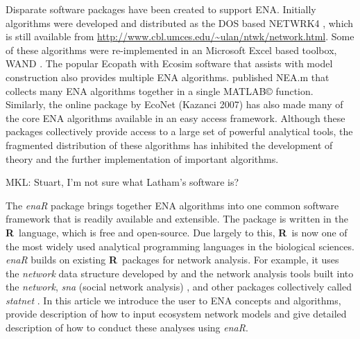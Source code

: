 \documentclass[article]{jss}
\newcommand{\R}{\textbf{R}}
\begin{document}
Disparate software packages have been created to support
ENA. Initially algorithms were developed and distributed as the DOS
based NETWRK4 \cite{ulanowicz91}, which is still available from
\url{http://www.cbl.umces.edu/~ulan/ntwk/network.html}.  Some of these
algorithms were re-implemented in an Microsoft Excel based toolbox,
WAND \cite{allesina04_wand}. The popular Ecopath with Ecosim software
that assists with model construction \citep{christensen04} also
provides multiple ENA algorithms. \citet{fath06} published NEA.m that
collects many ENA algorithms together in a single MATLAB\copyright
function. Similarly, the online package by EcoNet (Kazanci 2007) has
also made many of the core ENA algorithms available in an easy access
framework.  Although these packages collectively provide access to a
large set of powerful analytical tools, the fragmented distribution of
these algorithms has inhibited the development of theory and the
further implementation of important algorithms.

{\color{red} MKL: Stuart, I'm not sure what Latham's software is?}


The \textit{enaR} package brings together ENA algorithms into one
common software framework that is readily available and extensible.
The package is written in the \R\ language, which is free and
open-source.  Due largely to this, \R\ is now one of the most widely
used analytical programming languages in the biological
sciences. \textit{enaR} builds on existing \R\ packages for
network analysis. For example, it uses the \textit{network} data
structure developed by \citet{butts08_network} and the network
analysis tools built into the \textit{network}, \textit{sna} (social
network analysis) \citep{butts08_social}, and other packages
collectively called \textit{statnet} \citep{handcock2008statnet}. In
this article we introduce the user to ENA concepts and algorithms,
provide description of how to input ecosystem network models and give
detailed description of how to conduct these analyses using
\textit{enaR}.






\end{document}
